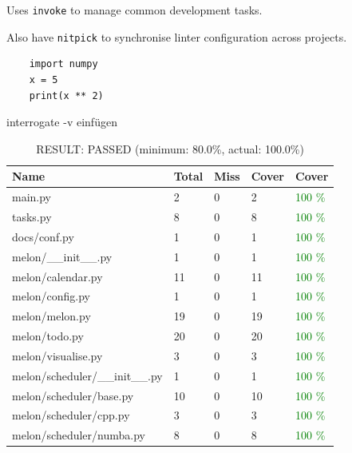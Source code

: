 \documentclass{prettytex/ox/mmsc-special-topic}
\begin{document}
  Uses \texttt{invoke} to manage common development tasks.

  Also have \texttt{nitpick} to synchronise linter configuration across projects.

  \begin{verbatim}
    import numpy
    x = 5
    print(x ** 2)
  \end{verbatim}

  interrogate -v einfügen

  \begin{table}[H]
    \centering
    \caption{RESULT: PASSED (minimum: 80.0\%, actual: 100.0\%)}
    \begin{tabular}{lllll}
      \hline
      \bf Name                        & \bf Total & \bf Miss & \bf Cover & \bf Cover                 \\
      \hline
      main.py                         & 2         & 0        & 2         & \textcolor{green}{100 \%} \\
      tasks.py                        & 8         & 0        & 8         & \textcolor{green}{100 \%} \\
      docs/conf.py                    & 1         & 0        & 1         & \textcolor{green}{100 \%} \\
      melon/\_\_init\_\_.py           & 1         & 0        & 1         & \textcolor{green}{100 \%} \\
      melon/calendar.py               & 11        & 0        & 11        & \textcolor{green}{100 \%} \\
      melon/config.py                 & 1         & 0        & 1         & \textcolor{green}{100 \%} \\
      melon/melon.py                  & 19        & 0        & 19        & \textcolor{green}{100 \%} \\
      melon/todo.py                   & 20        & 0        & 20        & \textcolor{green}{100 \%} \\
      melon/visualise.py              & 3         & 0        & 3         & \textcolor{green}{100 \%} \\
      melon/scheduler/\_\_init\_\_.py & 1         & 0        & 1         & \textcolor{green}{100 \%} \\
      melon/scheduler/base.py         & 10        & 0        & 10        & \textcolor{green}{100 \%} \\
      melon/scheduler/cpp.py          & 3         & 0        & 3         & \textcolor{green}{100 \%} \\
      melon/scheduler/numba.py        & 8         & 0        & 8         & \textcolor{green}{100 \%} \\

\end{tabular}
\end{table}
\end{document}
